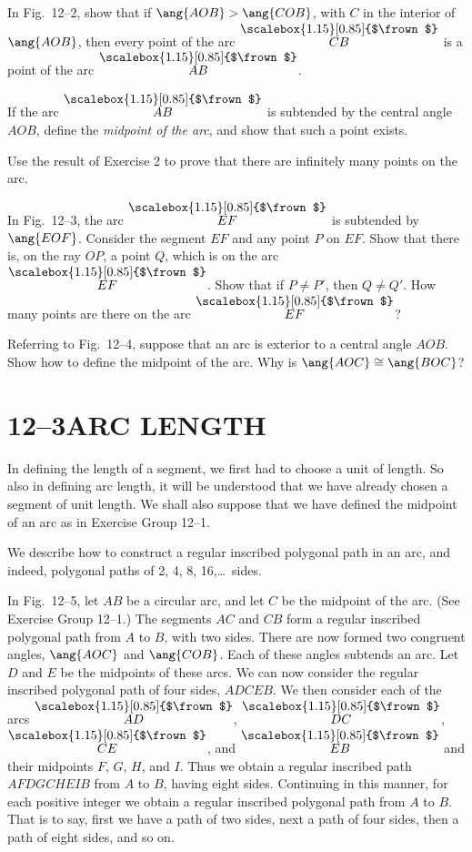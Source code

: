 \documentclass[11pt]{book}
\theoremstyle{bkplain}
\theoremstyle{XIplainnote}
\theoremstyle{bkplain}
\newcommand{\XIIarc}[1]{\overset{\raisebox{-0.25ex}{\scalebox{1.15}[0.85]{$\frown$}}}{#1}}
\theoremstyle{bkplain}
\begin{document}
\begin{exercisecols}
\begin{exlist}
\item In Fig.~12--2, show that if $\ang{AOB} > \ang{COB}$, with $C$ in the
      interior of $\ang{AOB}$, then every point of the arc $\XIIarc{CB}$ is a
      point of the arc $\XIIarc{AB}$.
\exfig{\FIGXIITWO}
\item If the arc $\XIIarc{AB}$ is subtended by the central angle $AOB$, define
      the \emph{midpoint of the arc}, and show that such a point exists.
\item Use the result of Exercise 2 to prove that there are infinitely many
      points on the arc.
\item In Fig.~12--3, the arc $\XIIarc{EF}$ is subtended by $\ang{EOF}$. Consider
      the segment $EF$ and any point $P$ on $EF$. Show that there is, on the ray
      $OP$, a point $Q$, which is on the arc $\XIIarc{EF}$. Show that if
      $P \neq P'$, then $Q \neq Q'$. How many points are there on the arc
      $\XIIarc{EF}$?
\exfig{\FIGXIITHREE}
\item Referring to Fig.~12--4, suppose that an arc is exterior to a central
      angle $AOB$. Show how to define the midpoint of the arc. Why is
      $\ang{AOC} \cong \ang{BOC}$?
\exfig{\FIGXIIFOUR}
\end{exlist}
\end{exercisecols}

\section*{12--3\quad ARC LENGTH}

In defining the length of a segment, we first had to choose a unit of length.
So also in defining arc length, it will be understood that we have already
chosen a segment of unit length. We shall also suppose that we have defined the
midpoint of an arc as in Exercise Group 12--1.

We describe how to construct a regular inscribed polygonal path in an arc, and
indeed, polygonal paths of 2, 4, 8, 16,\ldots\ sides.

In Fig.~12--5, let $AB$ be a circular arc, and let $C$ be the midpoint of the
arc. (See Exercise Group 12--1.) The segments $AC$ and $CB$ form a regular
inscribed polygonal path from $A$ to $B$, with two sides. There are now formed
two congruent angles, $\ang{AOC}$ and $\ang{COB}$. Each of these angles subtends
an arc. Let $D$ and $E$ be the midpoints of these arcs. We can now consider the
regular inscribed polygonal path of four sides, $ADCEB$. We then consider each
of the arcs $\XIIarc{AD}$, $\XIIarc{DC}$, $\XIIarc{CE}$, and $\XIIarc{EB}$ and
their midpoints $F$, $G$, $H$, and $I$. Thus we obtain a regular inscribed path
$AFDGCHEIB$ from $A$ to $B$, having eight sides. Continuing in this manner, for
each positive integer we obtain a regular inscribed polygonal path from $A$ to
$B$. That is to say, first we have a path of two sides, next a path of four
sides, then a path of eight sides, and so on.
\end{document}
